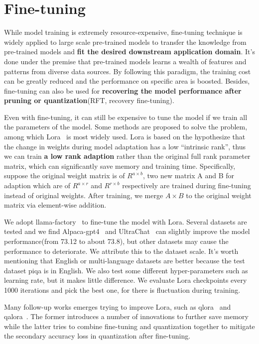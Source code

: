 \documentclass[conference]{IEEEtran}
\begin{document}
\section{Fine-tuning}
While model training is extremely resource-expensive, fine-tuning technique is widely applied to large scale pre-trained models to transfer the knowledge from pre-trained models and \textbf{fit the desired downstream application domain}. It's done under the premise that pre-trained models learns a wealth of features and patterns from diverse data sources. By following this paradigm, the training cost can be greatly reduced and the performance on specific area is boosted. Besides, fine-tuning can also be used for \textbf{recovering the model performance after pruning or quantization}(RFT, recovery fine-tuning).

Even with fine-tuning, it can still be expensive to tune the model if we train all the parameters of the model. Some methods are proposed to solve the problem, among which Lora~\cite{DBLP:journals/corr/abs-2106-09685} is most widely used. Lora is based on the hypothesize that the change in weights during model adaptation has a low “intrinsic rank”, thus we can train \textbf{a low rank adaption} rather than the original full rank parameter matrix, which can significantly save memory and training time. Specifically, suppose the original weight matrix is of ${R}^{a \times b}$, two new matrix A and B for adaption which are of ${R}^{a \times r}$ and ${R}^{r \times b}$ respectively are trained during fine-tuning instead of original weights. After training, we merge $A \times B$ to the original weight matrix via element-wise addition. 

We adopt llama-factory~\cite{zheng2024llamafactory} to fine-tune the model with Lora. Several datasets are tested and we find Alpaca-gpt4~\cite{peng2023instruction} and UltraChat~\cite{ding2023enhancing} can slightly improve the model performance(from 73.12 to about 73.8), but other datasets may cause the performance to deteriorate. We attribute this to the dataset scale.  It's worth mentioning that English or multi-language datasets are better because the test dataset piqa is in English. We also test some different hyper-parameters such as learning rate, but it makes little difference. We evaluate Lora checkpoints every 1000 iterations and pick the best one, for there is fluctuation during training.

Many follow-up works emerges trying to improve Lora, such as qlora~\cite{NEURIPS2023_1feb8787} and qalora~\cite{xu2023qalora}. The former introduces a number of innovations to further save memory while the latter tries to combine fine-tuning and quantization together to mitigate the secondary accuracy loss in quantization after fine-tuning.
\end{document}
